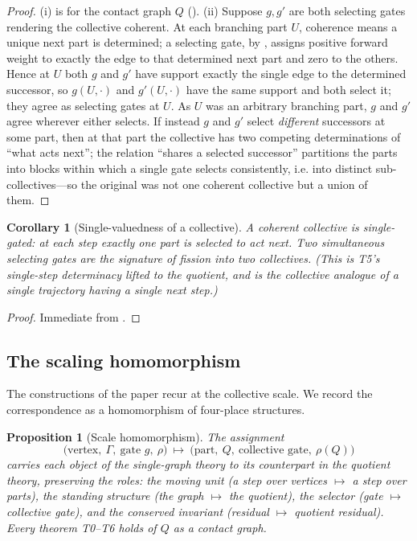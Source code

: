 \documentclass[11pt,a4paper]{article}
\theoremstyle{thmstyle}
\newtheorem{proposition}[theorem]{Proposition}
\newtheorem{corollary}[theorem]{Corollary}
\theoremstyle{definition}
\theoremstyle{remark}
\newcommand{\Gph}{\Gamma}                 %
\newcommand{\gate}{g}                     %
\newcommand{\Res}{\rho}                   %
\newcommand{\Quot}{Q}                     %
\begin{document}
\begin{proof}
(i) is  for the contact graph $\Quot$
(). (ii) Suppose $\gate,\gate'$ are both selecting gates rendering
the collective coherent. At each branching part $U$, coherence means a unique
next part is determined; a selecting gate, by , assigns positive
forward weight to exactly the edge to that determined next part and zero to the
others. Hence at $U$ both $\gate$ and $\gate'$ have support exactly the single
edge to the determined successor, so $\gate(U,\cdot)$ and $\gate'(U,\cdot)$ have
the same support and both select it; they agree as selecting gates at $U$. As $U$
was an arbitrary branching part, $\gate$ and $\gate'$ agree wherever either
selects. If instead $\gate$ and $\gate'$ select \emph{different} successors at
some part, then at that part the collective has two competing determinations of
``what acts next''; the relation ``shares a selected successor'' partitions the
parts into blocks within which a single gate selects consistently, i.e. into
distinct sub-collectives---so the original was not one coherent collective but a
union of them.
\end{proof}

\begin{corollary}[Single-valuedness of a collective]
\label{cor:single-valued}
A coherent collective is single-gated: at each step exactly one part is selected
to act next. Two simultaneous selecting gates are the signature of fission into
two collectives. \textup{(}This is T5's single-step determinacy lifted to the
quotient, and is the collective analogue of a single trajectory having a single
next step.\textup{)}
\end{corollary}

\begin{proof}
Immediate from .
\end{proof}

\subsection{The scaling homomorphism}

The constructions of the paper recur at the collective scale. We record the
correspondence as a homomorphism of four-place structures.

\begin{proposition}[Scale homomorphism]
\label{prop:homomorphism}
The assignment
\[
\bigl(\text{vertex},\ \Gph,\ \text{gate }\gate,\ \Res\bigr)
\ \longmapsto\
\bigl(\text{part},\ \Quot,\ \text{collective gate},\ \Res(\Quot)\bigr)
\]
carries each object of the single-graph theory to its counterpart in the quotient
theory, preserving the roles: the moving unit \textup{(}a step over vertices
$\mapsto$ a step over parts\textup{)}, the standing structure \textup{(}the graph
$\mapsto$ the quotient\textup{)}, the selector \textup{(}gate $\mapsto$ collective
gate\textup{)}, and the conserved invariant \textup{(}residual $\mapsto$ quotient
residual\textup{)}. Every theorem T0--T6 holds of $\Quot$ as a contact graph.
\end{proposition}
\end{document}
